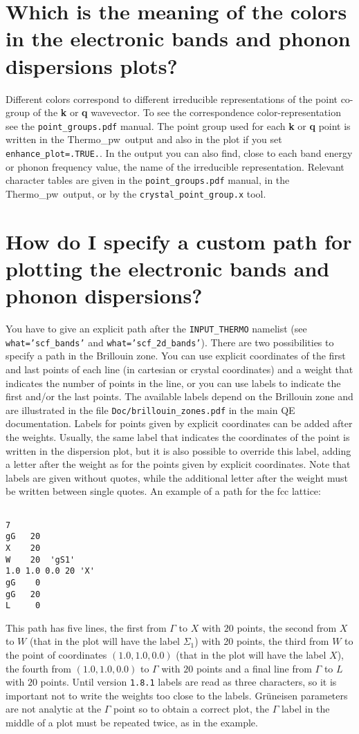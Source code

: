 \documentclass[12pt,a4paper,twoside]{report}
\def\thermo{{\sc Thermo}\_{\sc pw}}
\begin{document}
\newpage
{\color{coral}\section{Which is the meaning of the colors in
the electronic bands and phonon dispersions plots?}}
\color{black}
Different colors correspond to different irreducible representations of 
the point co-group of the {\bf k} or {\bf q} wavevector. To see the
correspondence color-representation see the \texttt{point\_groups.pdf} 
manual. The point group used for each {\bf k} or {\bf q} point is
written in the \thermo\ output and also in the plot if you set
\texttt{enhance\_plot=.TRUE.}. In the output you can also find,
close to each band energy or phonon frequency value, the name of the
irreducible representation. Relevant character tables are given in the
\texttt{point\_groups.pdf} manual, in the \thermo\ output, or by the
\texttt{crystal\_point\_group.x} tool.

\newpage
{\color{coral}\section{How do I specify a custom path for 
plotting the electronic bands and phonon dispersions?}}
\color{black}
You have to give an explicit path after the \texttt{INPUT\_THERMO}
namelist (see \texttt{what='scf\_bands'} and \texttt{what='scf\_2d\_bands'}). 
There are two possibilities to specify a path in the Brillouin zone.
You can use explicit coordinates of the first and last points of 
each line (in cartesian or crystal coordinates) and a weight that indicates
the number of points in the line, or you can use labels to 
indicate the first and/or the last points. The available labels depend on
the Brillouin zone and are illustrated in the file
\texttt{Doc/brillouin\_zones.pdf} in the main QE documentation.
Labels for points given by explicit coordinates can be added after 
the weights. 
Usually, the same label that indicates the coordinates of the point
is written in the dispersion plot, but it is also possible
to override this label, adding a letter after the weight as for 
the points given by explicit coordinates. 
Note that labels are given without quotes, while the additional letter
after the weight must be written between single quotes.
An example of a path for the fcc lattice:
\begin{verbatim}

7
gG   20   
X    20
W    20  'gS1'
1.0 1.0 0.0 20 'X'
gG    0
gG   20   
L     0
\end{verbatim}
This path has five lines, the first from $\Gamma$ to $X$ with $20$ points,
the second from $X$ to $W$ (that in the plot will have the label $\Sigma_1$)
with 20 points, the third from $W$ to the point of coordinates 
$(1.0, 1.0, 0.0)$ 
(that in the plot will have the label $X$), the fourth from $(1.0, 1.0, 0.0)$ 
to $\Gamma$ with $20$ points and a final line from $\Gamma$ to $L$ with 
$20$ points.
Until version \texttt{1.8.1} labels are read as three characters, so it 
is important not to write the weights too close to the labels.
Gr\"uneisen parameters are not analytic at the $\Gamma$ 
point so to obtain a correct plot, the $\Gamma$ label in the middle of a 
plot must be repeated twice, as in the example.
\end{document}
